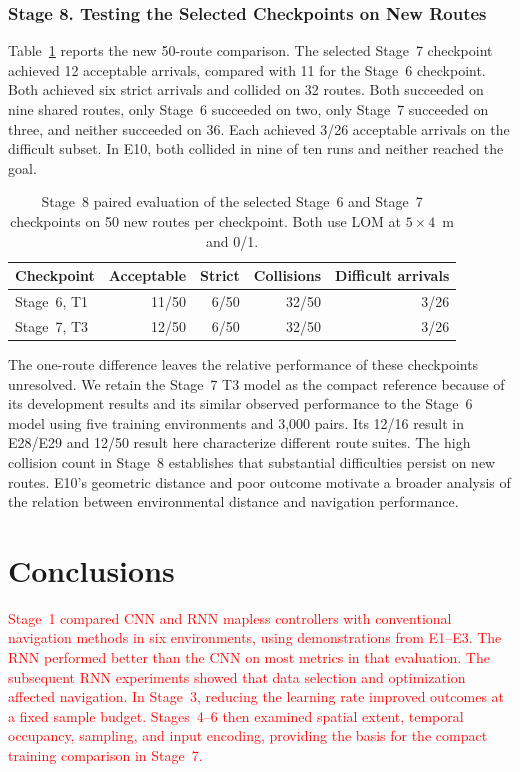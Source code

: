\documentclass[robotics,article,submit,pdftex,moreauthors]{Definitions/mdpi}
\begin{document}
\subsubsection{Stage 8. Testing the Selected Checkpoints on New Routes}\label{subsec:stage8_results}

Table~\ref{tab:ros2_paired} reports the new 50-route comparison. The selected Stage~7 checkpoint achieved 12 acceptable arrivals, compared with 11 for the Stage~6 checkpoint. Both achieved six strict arrivals and collided on 32 routes. Both succeeded on nine shared routes, only Stage~6 succeeded on two, only Stage~7 succeeded on three, and neither succeeded on 36. Each achieved 3/26 acceptable arrivals on the difficult subset. In E10, both collided in nine of ten runs and neither reached the goal.

\begin{table}[htbp]
\color{red}
\centering
\caption{Stage~8 paired evaluation of the selected Stage~6 and Stage~7 checkpoints on 50 new routes per checkpoint. Both use LOM at $5\times4$~m and 0/1.}
\label{tab:ros2_paired}
\small
\begin{tabular}{lrrrr}
\toprule
Checkpoint & Acceptable & Strict & Collisions & Difficult arrivals \\
\midrule
Stage~6, T1 & 11/50 & 6/50 & 32/50 & 3/26 \\
Stage~7, T3 & 12/50 & 6/50 & 32/50 & 3/26 \\
\bottomrule
\end{tabular}
\end{table}

The one-route difference leaves the relative performance of these checkpoints unresolved. We retain the Stage~7 T3 model as the compact reference because of its development results and its similar observed performance to the Stage~6 model using five training environments and 3,000 pairs. Its 12/16 result in E28/E29 and 12/50 result here characterize different route suites. The high collision count in Stage~8 establishes that substantial difficulties persist on new routes. E10's geometric distance and poor outcome motivate a broader analysis of the relation between environmental distance and navigation performance.
\endgroup

\section{Conclusions}\label{sec:Conclusion}

\textcolor{red}{Stage~1 compared CNN and RNN mapless controllers with conventional navigation methods in six environments, using demonstrations from E1--E3. The RNN performed better than the CNN on most metrics in that evaluation. The subsequent RNN experiments showed that data selection and optimization affected navigation. In Stage~3, reducing the learning rate improved outcomes at a fixed sample budget. Stages~4--6 then examined spatial extent, temporal occupancy, sampling, and input encoding, providing the basis for the compact training comparison in Stage~7.}
\end{document}
